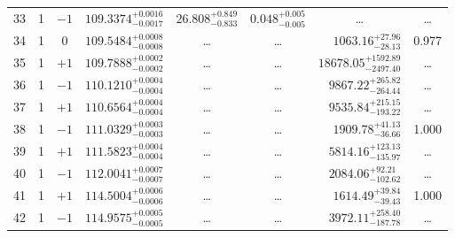 \begin{table*}[!]
\begin{tabular}{llcrrlrc}
33 & 1 & $-1$ & $    109.3374_{-      0.0017}^{+      0.0016}$ & $      26.808_{-       0.833}^{+       0.849}$ & $       0.048_{-       0.005}^{+       0.005}$ & \multicolumn{1}{c}{\dots} & \dots \\[1pt]
34 & 1 & 0 & $    109.5484_{-      0.0008}^{+      0.0008}$ & \multicolumn{1}{c}{\dots} & \multicolumn{1}{c}{\dots} & $     1063.16_{-       28.13}^{+       27.96}$ & 0.977\\[1pt]
35 & 1 & $+1$ & $    109.7888_{-      0.0002}^{+      0.0002}$ & \multicolumn{1}{c}{\dots} & \multicolumn{1}{c}{\dots} & $    18678.05_{-     2497.40}^{+     1592.89}$ & \dots \\[1pt]
36 & 1 & $-1$ & $    110.1210_{-      0.0004}^{+      0.0004}$ & \multicolumn{1}{c}{\dots} & \multicolumn{1}{c}{\dots} & $     9867.22_{-      264.44}^{+      265.82}$ & \dots \\[1pt]
37 & 1 & $+1$ & $    110.6564_{-      0.0004}^{+      0.0004}$ & \multicolumn{1}{c}{\dots} & \multicolumn{1}{c}{\dots} & $     9535.84_{-      193.22}^{+      215.15}$ & \dots \\[1pt]
38 & 1 & $-1$& $    111.0329_{-      0.0003}^{+      0.0003}$ & \multicolumn{1}{c}{\dots} & \multicolumn{1}{c}{\dots} & $     1909.78_{-       36.66}^{+       41.13}$ & 1.000\\[1pt]
39 & 1 & $+1$ & $    111.5823_{-      0.0004}^{+      0.0004}$ & \multicolumn{1}{c}{\dots} & \multicolumn{1}{c}{\dots} & $     5814.16_{-      135.97}^{+      123.13}$ & \dots \\[1pt]
40 & 1 & $-1$ & $    112.0041_{-      0.0007}^{+      0.0007}$ & \multicolumn{1}{c}{\dots} & \multicolumn{1}{c}{\dots} & $     2084.06_{-      102.62}^{+       92.21}$ & \dots \\[1pt]
41 & 1 & $+1$ & $    114.5004_{-      0.0006}^{+      0.0006}$ & \multicolumn{1}{c}{\dots} & \multicolumn{1}{c}{\dots} & $     1614.49_{-       39.43}^{+       39.84}$ & 1.000\\[1pt]
42 & 1 & $-1$ & $    114.9575_{-      0.0005}^{+      0.0005}$ & \multicolumn{1}{c}{\dots} & \multicolumn{1}{c}{\dots} & $     3972.11_{-      187.78}^{+      258.40}$ & \dots \\[1pt]


\end{tabular}
\end{table*}
